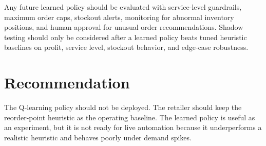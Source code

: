 \documentclass[11pt]{article}
\begin{document}
Any future learned policy should be evaluated with service-level guardrails, maximum order caps, stockout alerts, monitoring for abnormal inventory positions, and human approval for unusual order recommendations. Shadow testing should only be considered after a learned policy beats tuned heuristic baselines on profit, service level, stockout behavior, and edge-case robustness.

\section*{Recommendation}

The Q-learning policy should not be deployed. The retailer should keep the reorder-point heuristic as the operating baseline. The learned policy is useful as an experiment, but it is not ready for live automation because it underperforms a realistic heuristic and behaves poorly under demand spikes.
\end{document}
